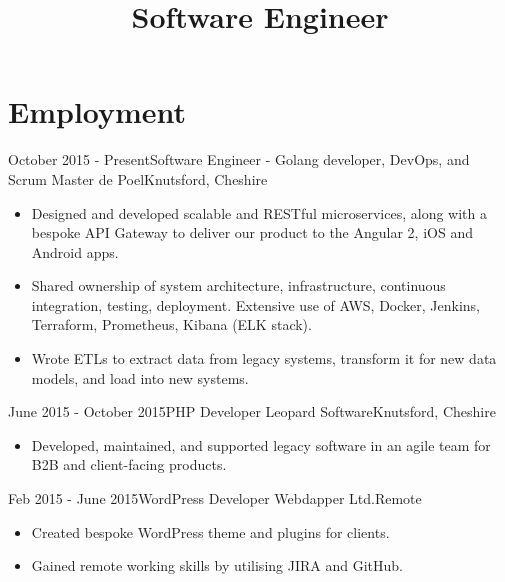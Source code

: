 \documentclass[11pt,a4paper]{moderncv}
\title{Software Engineer}
\begin{document}
	\maketitle

	\vspace{-3.5em}


	\section{Employment}
		\cventry
			{October 2015 - Present}{Software Engineer - Golang developer, DevOps, and Scrum Master}
			{de Poel}{Knutsford, Cheshire}
			{}{
			\vspace{.25em}
			\vspace{.1em}
			\begin{itemize}
				\item Designed and developed scalable and RESTful microservices, along with a bespoke API Gateway to deliver our product to the Angular 2, iOS and Android apps.
				\item Shared ownership of system architecture, infrastructure, continuous integration, testing, deployment. Extensive use of AWS, Docker, Jenkins, Terraform, Prometheus, Kibana (ELK stack).
				\item Wrote ETLs to extract data from legacy systems, transform it for new data models, and load into new systems.
			\end{itemize}}
		\cventry
			{June 2015 - October 2015}{PHP Developer}
			{Leopard Software}{Knutsford, Cheshire}
			{}{\begin{itemize}
				\item Developed, maintained, and supported legacy software in an agile team for B2B and client-facing products.
			\end{itemize}}
		\cventry
			{Feb 2015 - June 2015}{WordPress Developer}
			{Webdapper Ltd.}{Remote}
			{}{\begin{itemize}
				\item Created bespoke WordPress theme and plugins for clients.
				\item Gained remote working skills by utilising JIRA and GitHub.
			\end{itemize}}
\end{document}
